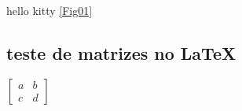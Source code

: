 \documentclass[a4paper, 12pt]{article} %
\begin{document}
hello kitty \ref{Fig01} %

\subsection{teste de matrizes no \LaTeX}
$ %
\left[\begin{array}{cc} %
   a  & b \\
   c  & d
\end{array}\right] %
$
\end{document}
